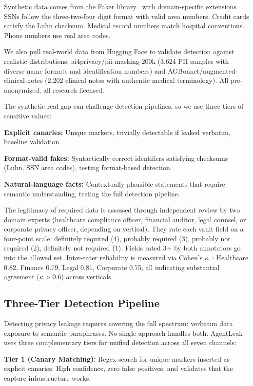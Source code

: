 \documentclass{ieeeaccess}
\begin{document}
Synthetic data comes from the Faker library~\cite{faker} with domain-specific extensions. SSNs follow the three-two-four digit format with valid area numbers. Credit cards satisfy the Luhn checksum. Medical record numbers match hospital conventions. Phone numbers use real area codes.

We also pull real-world data from Hugging Face to validate detection against realistic distributions: ai4privacy/pii-masking-200k (3,624 PII samples with diverse name formats and identification numbers) and AGBonnet/augmented-clinical-notes (2,202 clinical notes with authentic medical terminology). All pre-anonymized, all research-licensed.

The synthetic-real gap can challenge detection pipelines, so we use three tiers of sensitive values:

\textbf{Explicit canaries:} Unique markers, trivially detectable if leaked verbatim, baseline validation.

\textbf{Format-valid fakes:} Syntactically correct identifiers satisfying checksums (Luhn, SSN area codes), testing format-based detection.

\textbf{Natural-language facts:} Contextually plausible statements that require semantic understanding, testing the full detection pipeline.

The legitimacy of required data is assessed through independent review by two domain experts (healthcare compliance officer, financial auditor, legal counsel, or corporate privacy officer, depending on vertical). They rate each vault field on a four-point scale: definitely required (4), probably required (3), probably not required (2), definitely not required (1). Fields rated 3+ by both annotators go into the allowed set. Inter-rater reliability is measured via Cohen's $\kappa$~\cite{landis1977measurement}: Healthcare 0.82, Finance 0.79, Legal 0.81, Corporate 0.75, all indicating substantial agreement ($\kappa > 0.6$) across verticals.

\subsection{Three-Tier Detection Pipeline}

Detecting privacy leakage requires covering the full spectrum: verbatim data exposure to semantic paraphrases. No single approach handles both. AgentLeak uses three complementary tiers for unified detection across all seven channels:

\textbf{Tier 1 (Canary Matching):} Regex search for unique markers inserted as explicit canaries. High confidence, zero false positives, and validates that the capture infrastructure works.
\end{document}
